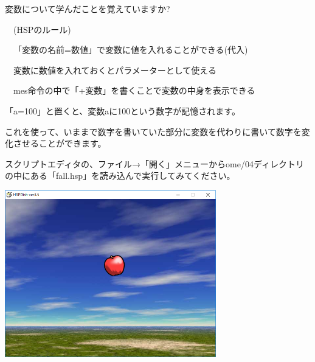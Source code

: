 \documentclass[a4paper,dvipdfmx]{jarticle}
\begin{document}
変数について学んだことを覚えていますか?


\bigskip

\ \ (HSPのルール)


\bigskip

\ \ 「変数の名前=数値」で変数に値を入れることができる(代入)

\ \ 変数に数値を入れておくとパラメーターとして使える

\ \ mes命令の中で「+変数」を書くことで変数の中身を表示できる


\bigskip

「a=100」と置くと、変数aに100という数字が記憶されます。

これを使って、いままで数字を書いていた部分に変数を代わりに書いて数字を変化させることができます。


\bigskip

スクリプトエディタの、ファイル→「開く」メニューからome/04ディレクトリの中にある「fall.hsp」を読み込んで実行してみてください。



\begin{center}
\includegraphics[width=9.183cm,height=7.241cm]{text04-img/text04-img019.png}

\end{center}

\bigskip


\bigskip


\bigskip


\bigskip


\bigskip


\bigskip


\bigskip


\bigskip


\bigskip


\bigskip


\bigskip
\end{document}
